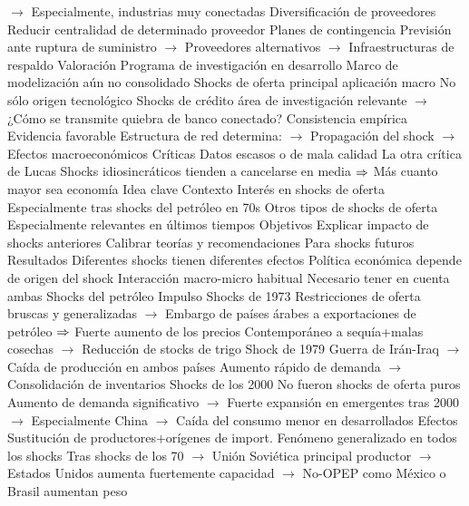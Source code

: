 \documentclass{nuevotema}
\begin{document}
\begin{esquemal}
				\4[] $\to$ Especialmente, industrias muy conectadas
				\4 Diversificación de proveedores
				\4[] Reducir centralidad de determinado proveedor
				\4 Planes de contingencia
				\4[] Previsión ante ruptura de suministro
				\4[] $\to$ Proveedores alternativos
				\4[] $\to$ Infraestructuras de respaldo
		\2 Valoración
			\3 Programa de investigación en desarrollo
				\4 Marco de modelización aún no consolidado
				\4 Shocks de oferta principal aplicación macro
				\4 No sólo origen tecnológico
				\4[] Shocks de crédito área de investigación relevante
				\4[] $\to$ ¿Cómo se transmite quiebra de banco conectado?
			\3 Consistencia empírica
				\4 Evidencia favorable
				\4[] Estructura de red determina:
				\4[] $\to$ Propagación del shock
				\4[] $\to$ Efectos macroeconómicos
			\3 Críticas
				\4 Datos escasos o de mala calidad
				\4 La otra crítica de Lucas
				\4[] Shocks idiosincráticos tienden a cancelarse en media
				\4[] $\Rightarrow$ Más cuanto mayor sea economía
	\1 
		\2 Idea clave
			\3 Contexto
				\4 Interés en shocks de oferta
				\4[] Especialmente tras shocks del petróleo en 70s
				\4 Otros tipos de shocks de oferta
				\4[] Especialmente relevantes en últimos tiempos
			\3 Objetivos
				\4 Explicar impacto de shocks anteriores
				\4 Calibrar teorías y recomendaciones
				\4[] Para shocks futuros
			\3 Resultados
				\4 Diferentes shocks tienen diferentes efectos
				\4 Política económica depende de origen del shock
				\4 Interacción macro-micro habitual
				\4[] Necesario tener en cuenta ambas
		\2 Shocks del petróleo
			\3 Impulso
				\4 Shocks de 1973
				\4[] Restricciones de oferta bruscas y generalizadas
				\4[] $\to$ Embargo de países árabes a exportaciones de petróleo
				\4[] $\Rightarrow$ Fuerte aumento de los precios
				\4[] Contemporáneo a sequía+malas cosechas
				\4[] $\to$ Reducción de stocks de trigo
				\4 Shock de 1979
				\4[] Guerra de Irán-Iraq
				\4[] $\to$ Caída de producción en ambos países
				\4[] Aumento rápido de demanda
				\4[] $\to$ Consolidación de inventarios
				\4 Shocks de los 2000
				\4[] No fueron shocks de oferta puros
				\4[] Aumento de demanda significativo
				\4[] $\to$ Fuerte expansión en emergentes tras 2000
				\4[] $\to$ Especialmente China
				\4[] $\to$ Caída del consumo menor en desarrollados
			\3 Efectos
				\4 Sustitución de productores+orígenes de import.
				\4[] Fenómeno generalizado en todos los shocks
				\4[] Tras shocks de los 70
				\4[] $\to$ Unión Soviética principal productor
				\4[] $\to$ Estados Unidos aumenta fuertemente capacidad
				\4[] $\to$ No-OPEP como México o Brasil aumentan peso

\end{esquemal}
\end{document}
